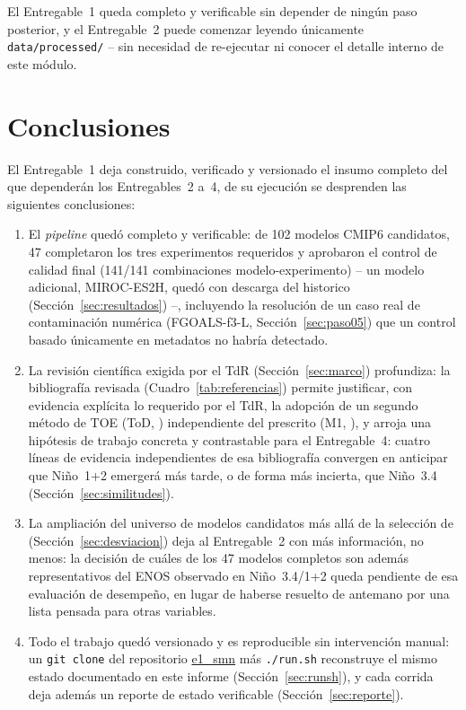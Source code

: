\documentclass[11pt,a4paper]{article}
\newcommand{\archivo}[1]{\begingroup\hypersetup{urlcolor=black}\url{#1}\endgroup}
\begin{document}
El Entregable~1 queda completo y verificable sin depender de ning\'un paso posterior, y el Entregable~2 puede comenzar leyendo \'unicamente \texttt{data/processed/} -- sin necesidad de re-ejecutar ni conocer el detalle interno de este m\'odulo.

\newpage
\section{Conclusiones}
\label{sec:conclusiones}

El Entregable~1 deja construido, verificado y versionado el insumo completo del que depender\'an los Entregables~2 a~4, de su ejecuci\'on se desprenden las siguientes conclusiones:

\begin{enumerate}[label=(\roman*)]

\item El \emph{pipeline} qued\'o completo y verificable: de 102 modelos CMIP6 candidatos, 47 completaron los tres experimentos requeridos y aprobaron el control de calidad final (141/141 combinaciones modelo-experimento) -- un modelo adicional, MIROC-ES2H, qued\'o con descarga del historico (Secci\'on~\ref{sec:resultados}) --, incluyendo la resoluci\'on de un caso real de contaminaci\'on num\'erica (FGOALS-f3-L, Secci\'on~\ref{sec:paso05}) que un control basado \'unicamente en metadatos no habr\'ia detectado.

\item La revisi\'on cient\'ifica exigida por el TdR (Secci\'on~\ref{sec:marco}) profundiza: la bibliograf\'ia revisada (Cuadro~\ref{tab:referencias}) permite justificar, con evidencia expl\'icita lo requerido por el TdR, la adopci\'on de un segundo m\'etodo de TOE (ToD, \citealp{gopika2024}) independiente del prescrito (M1, \citealp{szabo2016}), y arroja una hip\'otesis de trabajo concreta y contrastable para el Entregable~4: cuatro l\'ineas de evidencia independientes de esa bibliograf\'ia convergen en anticipar que Ni\~no~1+2 emerger\'a m\'as tarde, o de forma m\'as incierta, que Ni\~no~3.4 (Secci\'on~\ref{sec:similitudes}).

\item La ampliaci\'on del universo de modelos candidatos m\'as all\'a de la selecci\'on de \citet{bruno2023} (Secci\'on~\ref{sec:desviacion}) deja al Entregable~2 con m\'as informaci\'on, no menos: la decisi\'on de cu\'ales de los 47 modelos completos son adem\'as representativos del ENOS observado en Ni\~no~3.4/1+2 queda pendiente de esa evaluaci\'on de desempe\~no, en lugar de haberse resuelto de antemano por una lista pensada para otras variables.

\item Todo el trabajo qued\'o versionado y es reproducible sin intervenci\'on manual: un \texttt{git clone} del repositorio \archivo{e1_smn} m\'as \texttt{./run.sh} reconstruye el mismo estado documentado en este informe (Secci\'on~\ref{sec:runsh}), y cada corrida deja adem\'as un reporte de estado verificable (Secci\'on~\ref{sec:reporte}).
\end{enumerate}
\end{document}
